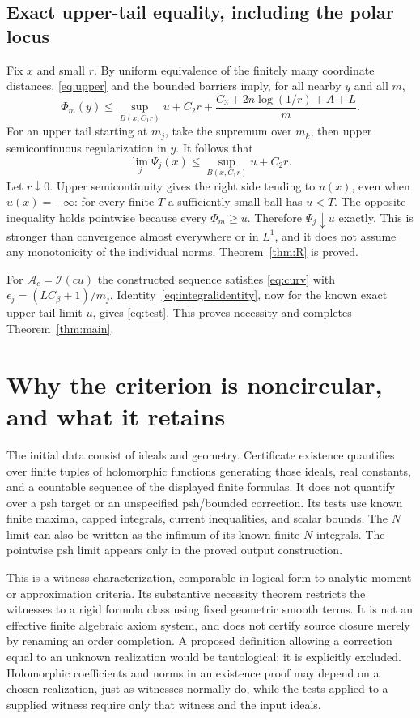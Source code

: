 \documentclass[11pt]{article}
\newcommand{\I}{\mathcal I}
\newcommand{\A}{\mathcal A}
\theoremstyle{definition}
\begin{document}
\subsection{Exact upper-tail equality, including the polar locus}
Fix $x$ and small $r$. By uniform equivalence of the finitely many
coordinate distances, \eqref{eq:upper} and the bounded barriers
imply, for all nearby $y$ and all $m$,
\[
 \Phi_m(y)\leq \sup_{B(x,C_1r)}u+C_2r+
 \frac{C_3+2n\log(1/r)+A+L}{m}.
\]
For an upper tail starting at $m_j$, take the supremum over $m_k$,
then upper semicontinuous regularization in $y$. It follows that
\[
 \lim_j\Psi_j(x)\leq \sup_{B(x,C_1r)}u+C_2r.
\]
Let $r\downarrow0$. Upper semicontinuity gives the right side
tending to $u(x)$, even when $u(x)=-\infty$: for every finite
$T$ a sufficiently small ball has $u<T$.
The opposite inequality holds pointwise because every
$\Phi_m\geq u$. Therefore $\Psi_j\downarrow u$ exactly.
This is stronger than convergence almost everywhere or in $L^1$,
and it does not assume any monotonicity of the individual norms.
Theorem~\ref{thm:R} is proved.

For $\A_c=\I(cu)$ the constructed sequence satisfies
\eqref{eq:curv} with $\epsilon_j=(LC_\beta+1)/m_j$.
Identity~\eqref{eq:integralidentity}, now for the known exact
upper-tail limit $u$, gives \eqref{eq:test}. This proves necessity
and completes Theorem~\ref{thm:main}.

\section{Why the criterion is noncircular, and what it retains}
The initial data consist of ideals and geometry. Certificate
existence quantifies over finite tuples of holomorphic functions
generating those ideals, real constants, and a countable sequence
of the displayed finite formulas. It does not quantify over a
psh target or an unspecified psh/bounded correction. Its tests
use known finite maxima, capped integrals, current inequalities,
and scalar bounds. The $N$ limit can also be written as the
infimum of its known finite-$N$ integrals. The pointwise psh
limit appears only in the proved output construction.

This is a witness characterization, comparable in logical form
to analytic moment or approximation criteria. Its substantive
necessity theorem restricts the witnesses to a rigid formula
class using fixed geometric smooth terms. It is not an effective
finite algebraic axiom system, and does not certify source closure
merely by renaming an order completion. A proposed definition
allowing a correction equal to an unknown realization would be
tautological; it is explicitly excluded. Holomorphic coefficients
and norms in an existence proof may depend on a chosen realization,
just as witnesses normally do, while the tests applied to a
supplied witness require only that witness and the input ideals.
\end{document}
